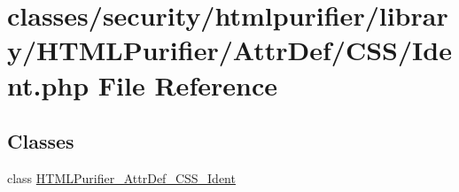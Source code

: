 \hypertarget{Ident_8php}{\section{classes/security/htmlpurifier/library/\+H\+T\+M\+L\+Purifier/\+Attr\+Def/\+C\+S\+S/\+Ident.php File Reference}
\label{Ident_8php}
}
\subsection*{Classes}
\begin{DoxyCompactItemize}
\item 
class \hyperlink{classHTMLPurifier__AttrDef__CSS__Ident}{H\+T\+M\+L\+Purifier\+\_\+\+Attr\+Def\+\_\+\+C\+S\+S\+\_\+\+Ident}
\end{DoxyCompactItemize}
